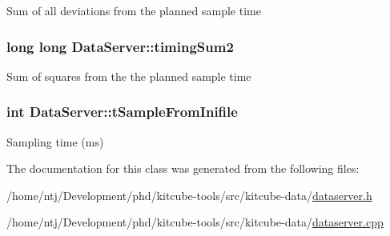 Sum of all deviations from the planned sample time \hypertarget{classDataServer_a4179f96aea793a3f9d4b4269c91af858}{
\subsubsection[{timing\-Sum2}]{\setlength{\rightskip}{0pt plus 5cm}long long Data\-Server\-::timing\-Sum2\hspace{0.3cm}{\ttfamily [private]}}}\label{classDataServer_a4179f96aea793a3f9d4b4269c91af858}
Sum of squares from the the planned sample time \hypertarget{classDataServer_a0b926a7dc0e5ddcf958abedd937c362b}{
\subsubsection[{t\-Sample\-From\-Inifile}]{\setlength{\rightskip}{0pt plus 5cm}int Data\-Server\-::t\-Sample\-From\-Inifile\hspace{0.3cm}{\ttfamily [private]}}}\label{classDataServer_a0b926a7dc0e5ddcf958abedd937c362b}
Sampling time (ms) 

The documentation for this class was generated from the following files\-:\begin{DoxyCompactItemize}
\item 
/home/ntj/\-Development/phd/kitcube-\/tools/src/kitcube-\/data/\hyperlink{dataserver_8h}{dataserver.\-h}\item 
/home/ntj/\-Development/phd/kitcube-\/tools/src/kitcube-\/data/\hyperlink{dataserver_8cpp}{dataserver.\-cpp}\end{DoxyCompactItemize}
